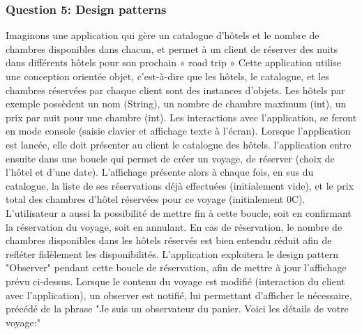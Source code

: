 \subsubsection{Question 5: Design patterns}
Imaginons une application qui gère un catalogue d'hôtels et le nombre de chambres disponibles dans chacun, et permet à un client de réserver des nuits dans différents hôtels pour son prochain « road trip »
Cette application utilise une conception orientée objet, c'est-à-dire que les hôtels, le catalogue, et les chambres réservées par chaque client sont des instances d'objets. Les hôtels par exemple possèdent un nom (String), un nombre de chambre maximum (int), un prix par nuit pour une chambre (int).
Les interactions avec l'application, se feront en mode console (saisie clavier et affichage texte à l'écran). Lorsque l'application est lancée, elle doit présenter au client le catalogue des hôtels.
l'application entre ensuite dans une boucle qui permet de créer un voyage, de réserver (choix de l'hôtel et d'une date). L'affichage présente alors à chaque fois, en sus du catalogue, la liste de ses réservations déjà effectuées (initialement vide), et le prix total des chambres d'hôtel réservées pour ce voyage (initialement 0C). L'utilisateur a aussi la possibilité de mettre fin à cette boucle, soit en confirmant la réservation du voyage, soit en annulant. En cas de réservation, le nombre de chambres disponibles dans les hôtels réservés est bien entendu réduit afin de refléter fidèlement les disponibilités.
L'application exploitera le design pattern "Observer" pendant cette boucle de réservation, afin de mettre à jour l'affichage prévu ci-dessus. Lorsque le contenu du voyage est modifié (interaction du client avec l'application), un observer est notifié, lui permettant d'afficher le nécessaire, précédé de la phrase "Je suis un observateur du panier. Voici les détails de votre voyage:"
